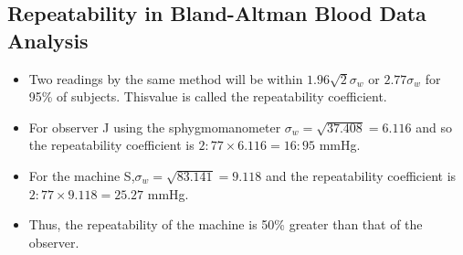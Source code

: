 \documentclass[12pt, a4paper]{article}
\begin{document}
\subsection{Repeatability in Bland-Altman Blood Data Analysis}
\begin{itemize}
	\item Two readings by the same method will be within $1.96
	\sqrt{2} \sigma_w $ or $2.77 \sigma_w $ for 95\% of subjects. Thisvalue is called the repeatability coefficient.
	
	\item For observer J using the sphygmomanometer $ \sigma_w = \sqrt{37.408} = 6.116$ and so the repeatability coefficient is
	$2:77 \times 6.116 = 16:95$ mmHg.
	
	\item For the machine S,$ \sigma_w = \sqrt{83.141} = 9.118$ and the repeatability coefficient is $2:77 \times 9.118 = 25.27$ mmHg.
	
	\item Thus, the repeatability of the machine is 50\% greater than that of the observer.
\end{itemize}
\end{document}
